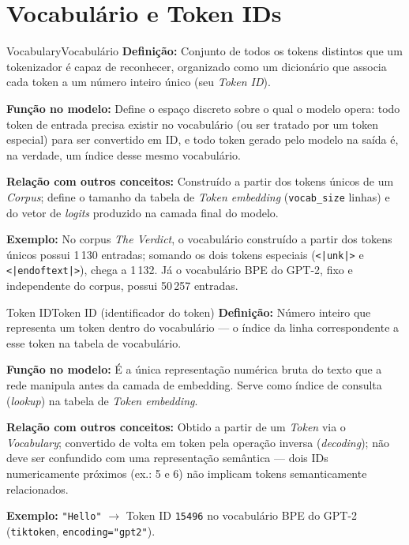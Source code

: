 \documentclass[11pt,a4paper]{article}
\newcommand{\campo}[2]{\textbf{\textcolor{accentblue}{#1:}} #2\par\smallskip}
\begin{document}
\section{Vocabulário e Token IDs}

\begin{termo}{Vocabulary}{Vocabulário}
\campo{Definição}{Conjunto de todos os tokens distintos que um tokenizador é capaz de
reconhecer, organizado como um dicionário que associa cada token a um número inteiro
único (seu \emph{Token ID}).}
\campo{Função no modelo}{Define o espaço discreto sobre o qual o modelo opera: todo
token de entrada precisa existir no vocabulário (ou ser tratado por um token especial)
para ser convertido em ID, e todo token gerado pelo modelo na saída é, na verdade, um
índice desse mesmo vocabulário.}
\campo{Relação com outros conceitos}{Construído a partir dos tokens únicos de um
\emph{Corpus}; define o tamanho da tabela de \emph{Token embedding}
(\texttt{vocab\_size} linhas) e do vetor de \emph{logits} produzido na camada final do
modelo.}
\campo{Exemplo}{No corpus \emph{The Verdict}, o vocabulário construído a partir dos
tokens únicos possui 1\,130 entradas; somando os dois tokens especiais
(\texttt{<|unk|>} e \texttt{<|endoftext|>}), chega a 1\,132. Já o vocabulário BPE do
GPT-2, fixo e independente do corpus, possui 50\,257 entradas.}
\end{termo}

\begin{termo}{Token ID}{Token ID (identificador do token)}
\campo{Definição}{Número inteiro que representa um token dentro do vocabulário --- o
índice da linha correspondente a esse token na tabela de vocabulário.}
\campo{Função no modelo}{É a única representação numérica bruta do texto que a rede
manipula antes da camada de embedding. Serve como índice de consulta (\emph{lookup}) na
tabela de \emph{Token embedding}.}
\campo{Relação com outros conceitos}{Obtido a partir de um \emph{Token} via o
\emph{Vocabulary}; convertido de volta em token pela operação inversa
(\emph{decoding}); não deve ser confundido com uma representação semântica --- dois IDs
numericamente próximos (ex.: 5 e 6) não implicam tokens semanticamente relacionados.}
\campo{Exemplo}{\texttt{"Hello"} $\rightarrow$ Token ID \texttt{15496} no vocabulário
BPE do GPT-2 (\texttt{tiktoken}, \texttt{encoding="gpt2"}).}
\end{termo}
\end{document}
